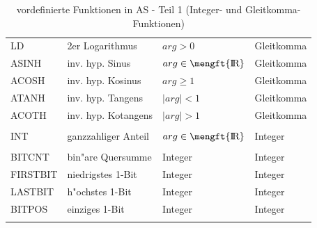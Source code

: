 \documentclass[12pt,a4paper,twoside]{report}
\newcommand{\asname}{AS}
\def \rz{\hbox{\mengft{I \hskip -1.7mm R}}}
\begin{document}
\begin{center}
\begin{longtable}{|l|l|l|l|}
LD       & 2er Logarithmus      & $arg > 0$ & Gleitkomma \\
ASINH    & inv. hyp. Sinus      & $arg \in \rz$ & Gleitkomma \\
ACOSH    & inv. hyp. Kosinus    & $arg \geq 1$ & Gleitkomma \\
ATANH    & inv. hyp. Tangens    & $\mid arg \mid < 1$ & Gleitkomma \\
ACOTH    & inv. hyp. Kotangens  & $\mid arg \mid > 1$ & Gleitkomma \\
         &                      & & \\
INT      & ganzzahliger Anteil  & $arg \in \rz$ & Integer \\
         &                      & & \\
BITCNT   & bin"are Quersumme    & Integer      & Integer \\
FIRSTBIT & niedrigstes 1-Bit    & Integer      & Integer \\
LASTBIT  & h"ochstes 1-Bit      & Integer      & Integer \\
BITPOS   & einziges 1-Bit       & Integer      & Integer \\
\hline
\caption{vordefinierte Funktionen in \asname{} - Teil 1 (Integer- und
         Gleitkomma-Funktionen)\label{TabFuncs1}}
\end{longtable}\end{center}
\end{document}
